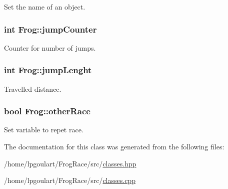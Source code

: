 Set the name of an object. 

\subsubsection[{\texorpdfstring{jump\+Counter}{jumpCounter}}]{\setlength{\rightskip}{0pt plus 5cm}int Frog\+::jump\+Counter\hspace{0.3cm}{\ttfamily [private]}}\hypertarget{classFrog_a3d38d6ca4384c9d2cb4b770d93cf7dd5}{}\label{classFrog_a3d38d6ca4384c9d2cb4b770d93cf7dd5}


Counter for number of jumps. 

\subsubsection[{\texorpdfstring{jump\+Lenght}{jumpLenght}}]{\setlength{\rightskip}{0pt plus 5cm}int Frog\+::jump\+Lenght\hspace{0.3cm}{\ttfamily [private]}}\hypertarget{classFrog_a8ce20ccfa8a10afc1465a2c60e33b53d}{}\label{classFrog_a8ce20ccfa8a10afc1465a2c60e33b53d}


Travelled distance. 

\subsubsection[{\texorpdfstring{other\+Race}{otherRace}}]{\setlength{\rightskip}{0pt plus 5cm}bool Frog\+::other\+Race\hspace{0.3cm}{\ttfamily [static]}}\hypertarget{classFrog_a3069c74fde5e33eb58c40c655b1ad8f7}{}\label{classFrog_a3069c74fde5e33eb58c40c655b1ad8f7}


Set variable to repet race. 



The documentation for this class was generated from the following files\+:\begin{DoxyCompactItemize}
\item 
/home/lpgoulart/\+Frog\+Race/src/\hyperlink{classes_8hpp}{classes.\+hpp}\item 
/home/lpgoulart/\+Frog\+Race/src/\hyperlink{classes_8cpp}{classes.\+cpp}\end{DoxyCompactItemize}
